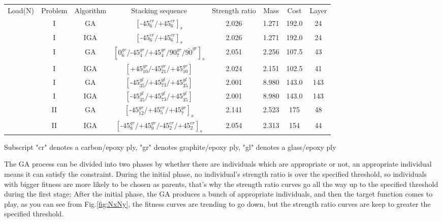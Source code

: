 \documentclass[smallextended]{svjour3}       %
\begin{document}
\begin{center}
\begin{tabular}{cccccccc}
	\toprule
	Load(N)                                                 &  Problem  &   Algorithm      & Stacking sequence                                    & Strength ratio  & Mass  &  Cost   & Layer    \\ 
	     &       I   &  GA   &  $[\text{-}45_{6}^{cr}/\text{+}45_{6}^{cr}]_s$                        & 2.026           & 1.271 &  192.0  & 24  \\
	                                                        &       I   &  IGA   &  $[\text{-}45_{6}^{cr}/\text{+}45_{6}^{cr}]_s$                        & 2.026           & 1.271 &  192.0  & 24  \\
															&       I   &  GA    &  $[0_6^{gr}/\text{-}45_{4}^{gr}/\text{+}45_{4}^{gr}/90_{7}^{gr}/\bar{90}^{gr}]_s$     & 2.051           & 2.256 &  107.5  & 43  \\
															&       I   &  IGA    &  $[\text{+}45_{10}^{gr}/\text{-}45_{21}^{gr}/\text{+}45_{10}^{gr}]$    & 2.024           & 2.151 &  102.5  & 41  \\
															&       I   &  GA    &  $[\text{-}45_{35}^{gl}/\text{+}45_{73}^{gl}/\text{+}45_{35}^{gl}]$    & 2.001           & 8.980 &  143.0  & 143  \\
															&       I   &  IGA    &  $[\text{-}45_{35}^{gl}/\text{+}45_{73}^{gl}/\text{+}45_{35}^{gl}]$    & 2.001           & 8.980 &  143.0  & 143  \\
															&       II  &  GA    &
	$[\text{-}45_{12}^{gr}/\text{+}45_{5}^{cr}/\text{+}45_{7}^{gr}]_s$         & 2.141
										  & 2.523 & 175& 48  \\
															&       II  &  IGA    &
	$[\text{-}45_{9}^{gr}/\text{+}45_{9}^{gr}/\text{-}45_{2}^{cr}/\text{+}45_{2}^{cr}]_s$         & 2.054
										  & 2.313 & 154& 44  \\
	\bottomrule
\end{tabular}
\label{tab:NxNy}
\begin{tablenotes}\footnotesize
     Subscript "cr" denotes a carbon/epoxy ply, "gr" denotes graphite/epoxy ply, "gl" denotes a
	glass/epoxy ply
\end{tablenotes}
\end{center}
The GA process can be divided into two phases by whether there are individuals which are
appropriate or not,
an appropriate individual means it can satisfy the constraint. During the initial phase, no individual's
strength ratio is over the specified threshold, so individuals with bigger fitness are more likely to be
chosen as parents, that's why the strength ratio curves go all the way up to the specified
threshold during the first stage; After the initial phase, the GA produces a bunch of appropriate
individuals, and then the target function comes to play, as you can see from Fig.\ref{fig:NxNy}, the
fitness curves are trending to go down, but the strength ratio curves are keep to greater the
specified threshold.
\end{document}
